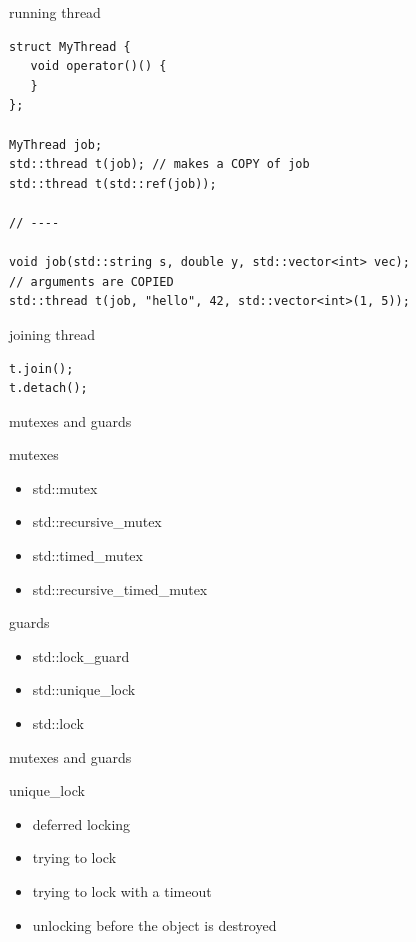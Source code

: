 \documentclass{beamer}
\begin{document}
\begin{frame}[fragile]{running thread}
\begin{block}{}
\begin{verbatim}
struct MyThread {
   void operator()() {
   }
};

MyThread job;
std::thread t(job); // makes a COPY of job
std::thread t(std::ref(job));

// ----

void job(std::string s, double y, std::vector<int> vec);
// arguments are COPIED
std::thread t(job, "hello", 42, std::vector<int>(1, 5));

\end{verbatim}
\end{block}
\end{frame}

\begin{frame}[fragile]{joining thread}
\begin{block}{}
\begin{verbatim}
t.join();
t.detach();

\end{verbatim}
\end{block}
\end{frame}

\begin{frame}{mutexes and guards}
  \begin{block}{mutexes}
    \begin{itemize}
    \item std::mutex
    \item std::recursive\_mutex
    \item std::timed\_mutex
    \item std::recursive\_timed\_mutex
    \end{itemize}
  \end{block}

  \begin{block}{guards}
    \begin{itemize}
    \item std::lock\_guard
    \item std::unique\_lock
    \item std::lock
    \end{itemize}
  \end{block}

\end{frame}

\begin{frame}{mutexes and guards}
  \begin{block}{unique\_lock}
    \begin{itemize}
    \item deferred locking
    \item trying to lock
    \item trying to lock with a timeout
    \item unlocking before the object is destroyed
    \end{itemize}
  \end{block}
\end{frame}
\end{document}
